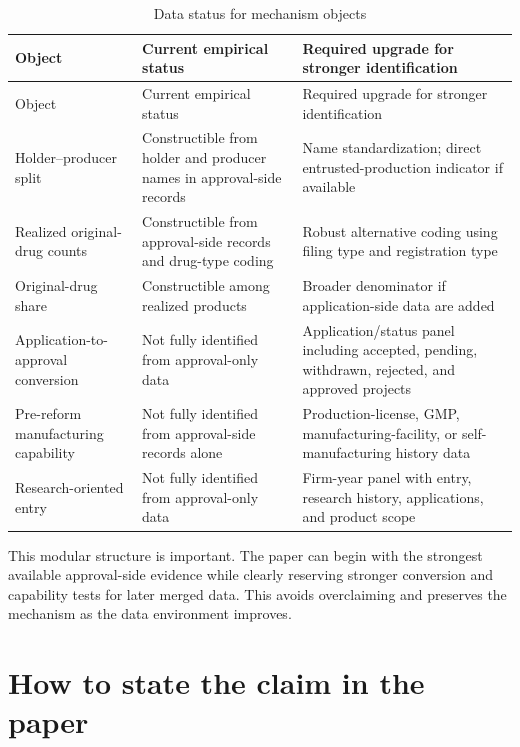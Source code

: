 \documentclass[12pt]{article}
\begin{document}
\begin{longtable}{p{}p{}p{}}
\caption{Data status for mechanism objects}\label{tab:data_status}\\
\toprule
Object & Current empirical status & Required upgrade for stronger identification \\
\midrule
\endfirsthead
\toprule
Object & Current empirical status & Required upgrade for stronger identification \\
\midrule
\endhead
Holder--producer split & Constructible from holder and producer names in approval-side records & Name standardization; direct entrusted-production indicator if available \\
\addlinespace
Realized original-drug counts & Constructible from approval-side records and drug-type coding & Robust alternative coding using filing type and registration type \\
\addlinespace
Original-drug share & Constructible among realized products & Broader denominator if application-side data are added \\
\addlinespace
Application-to-approval conversion & Not fully identified from approval-only data & Application/status panel including accepted, pending, withdrawn, rejected, and approved projects \\
\addlinespace
Pre-reform manufacturing capability & Not fully identified from approval-side records alone & Production-license, GMP, manufacturing-facility, or self-manufacturing history data \\
\addlinespace
Research-oriented entry & Not fully identified from approval-only data & Firm-year panel with entry, research history, applications, and product scope \\
\bottomrule
\end{longtable}

This modular structure is important. The paper can begin with the strongest available approval-side evidence while clearly reserving stronger conversion and capability tests for later merged data. This avoids overclaiming and preserves the mechanism as the data environment improves.

\section{How to state the claim in the paper}
\end{document}
